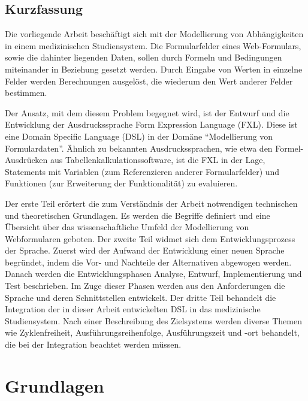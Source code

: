 \documentclass [11pt,smallheadings, a4paper]{report}
\begin{document}

\chapter*{Kurzfassung}
Die vorliegende Arbeit beschäftigt sich mit der Modellierung von Ab\-hän\-gig\-kei\-ten in einem medizinischen Studiensystem. Die Formularfelder eines Web-Formulars, sowie die dahinter liegenden Daten, sollen durch Formeln und Bedingungen miteinander in Beziehung gesetzt werden. Durch Eingabe von Werten in einzelne Felder werden Berechnungen ausgelöst, die wiederum den Wert anderer Felder bestimmen.

Der Ansatz, mit dem diesem Problem begegnet wird, ist der Entwurf und die Entwicklung der Ausdruckssprache Form Expression Language (FXL). Diese ist eine Domain Specific Language (DSL) in der Domäne ``Modellierung von Formulardaten''. Ähnlich zu bekannten Ausdruckssprachen, wie etwa den Formel-Ausdrücken aus Tabellenkalkulationssoftware, ist die FXL in der Lage, Statements mit Variablen (zum Referenzieren anderer For\-mu\-lar\-fel\-der) und Funktionen (zur Erweiterung der Funktionalität) zu evaluieren.

Der erste Teil erörtert die zum Verständnis der Arbeit notwendigen technischen und theoretischen Grundlagen. Es werden die Begriffe definiert und eine Über\-sicht über das wissenschaftliche Umfeld der Modellierung von Webformularen geboten.
Der zweite Teil widmet sich dem Entwicklungsprozess der Sprache. Zuerst wird der Aufwand der Entwicklung einer neuen Sprache begründet, indem die Vor- und Nachteile der Alternativen abgewogen werden. Danach werden die Entwicklungsphasen Analyse, Entwurf, Implementierung und Test beschrieben. Im Zuge dieser Phasen werden aus den Anforderungen die Sprache und deren Schnittstellen entwickelt.
Der dritte Teil behandelt die Integration der in dieser Arbeit entwickelten DSL in das medizinische Studiensystem. Nach einer Beschreibung des Zielsystems werden diverse Themen wie Zyklenfreiheit, Ausführungsreihenfolge, Ausführungszeit und -ort behandelt, die bei der Integration beachtet werden müssen.







\part{Grundlagen}
\label{part_grundlagen}

\end{document}
